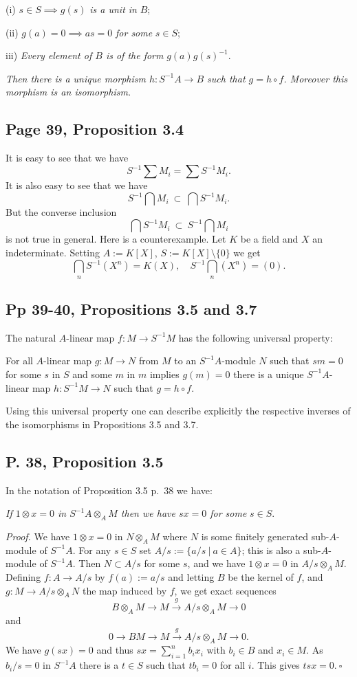 \documentclass[parskip=half,fontsize=12pt]{scrartcl}%
\newcommand{\xr}{\xrightarrow}
\begin{document}
(i) $s\in S\implies g(s)$ \emph{is a unit in} $B$;

(ii) $g(a)=0\implies as=0$ \emph{for some} $s\in S$;

iii) \emph{Every element of $B$ is of the form} $g(a)g(s)^{-1}$.

\emph{Then there is a unique morphism $h:S^{-1}A\to B$ such that $g=h\circ f$. Moreover this morphism is an isomorphism.}

\subsection{Page 39, Proposition 3.4}%

It is easy to see that we have 
$$
S^{-1}\sum M_i=\sum S^{-1}M_i.
$$ 
It is also easy to see that we have 
$$
S^{-1}\bigcap M_i\ \subset\ \bigcap S^{-1}M_i.
$$ 
But the converse inclusion 
$$
\bigcap S^{-1}M_i\ \subset\ S^{-1}\bigcap M_i
$$ 
is not true in general. Here is a counterexample. Let $K$ be a field and $X$ an indeterminate. Setting $A:=K[X]$, $S:=K[X]\setminus\{0\}$ we get 
$$
\bigcap_n S^{-1}(X^n)=K(X),\quad S^{-1}\bigcap_n(X^n)=(0).
$$

\subsection{Pp 39-40, Propositions 3.5 and 3.7}%

The natural $A$-linear map $f:M\to S^{-1}M$ has the following universal property:

For all $A$-linear map $g:M\to N$ from $M$ to an $S^{-1}A$-module $N$ such that $sm=0$ for some $s$ in $S$ and some $m$ in $m$ implies $g(m)=0$ there is a unique $S^{-1}A$-linear map $h:S^{-1}M\to N$ such that $g=h\circ f$.

Using this universal property one can describe explicitly the respective inverses of the isomorphisms in Propositions 3.5 and 3.7.

\subsection{P. 38, Proposition 3.5}%

In the notation of Proposition 3.5 p.~38 we have:

\emph{If $1\otimes x=0$ in $S^{-1}A\otimes_AM$ then we have $sx=0$ for some} $s\in S$.

\emph{Proof.} We have $1\otimes x=0$ in $N\otimes_AM$ where $N$ is some finitely generated sub-$A$-module of $S^{-1}A$. For any $s\in S$ set $A/s:=\{a/s\ |\ a\in A\}$; this is also a sub-$A$-module of $S^{-1}A$. Then $N\subset A/s$ for some $s$, and we have $1\otimes x=0$ in $A/s\otimes_AM$. Defining $f:A\to A/s$ by $f(a):=a/s$ and letting $B$ be the kernel of $f$, and $g:M\to A/s\otimes_AN$ the map induced by $f$, we get exact sequences 
$$
B\otimes_AM\to M\xr gA/s\otimes_AM\to0
$$ 
and 
$$
0\to BM\to M\xr gA/s\otimes_AM\to0.
$$ 
We have $g(sx)=0$ and thus $sx=\sum_{i=1}^nb_ix_i$ with $b_i\in B$ and $x_i\in M$. As $b_i/s=0$ in $S^{-1}A$ there is a $t\in S$ such that $tb_i=0$ for all $i$. This gives $tsx=0.\ \square$
\end{document}
